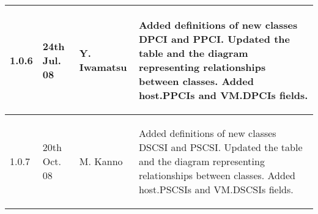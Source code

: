\begin{center}
\begin{tabular}{|l|l|l|l|}
  \hline
  1.0.6 & 24th Jul. 08 & Y. Iwamatsu &
   \begin{minipage}[t]{7cm}
    \begin{flushleft}
     Added definitions of new classes DPCI and PPCI. Updated the table
     and the diagram representing relationships between classes.
     Added host.PPCIs and VM.DPCIs fields.
    \end{flushleft}
   \end{minipage}\\
  \hline
  1.0.7 & 20th Oct. 08 & M. Kanno &
   \begin{minipage}[t]{7cm}
    \begin{flushleft}
     Added definitions of new classes DSCSI and PSCSI. Updated the table
     and the diagram representing relationships between classes.
     Added host.PSCSIs and VM.DSCSIs fields.
    \end{flushleft}
   \end{minipage}\\
  \hline
 \end{tabular}
\end{center}
